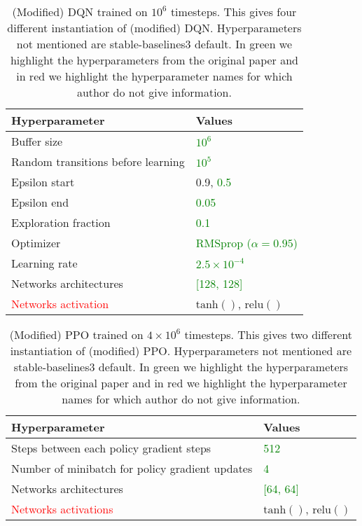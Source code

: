 \begin{table}[H]
    \centering
    \caption{(Modified) DQN trained on $10^6$ timesteps. This gives four different instantiation of (modified) DQN. Hyperparameters not mentioned are stable-baselines3 default. In green we highlight the hyperparameters from the original paper and in red we highlight the hyperparameter names for which author do not give information.}\label{tab:ibmdp-rl1}
    \begin{tabular}{ll}
    \toprule
    \textbf{Hyperparameter} & \textbf{Values}\\
    \midrule
    Buffer size & \textcolor{green}{$10^6$} \\
    Random transitions before learning & \textcolor{green}{$10^5$} \\
    Epsilon start & 0.9, \textcolor{green}{0.5} \\
    Epsilon end & \textcolor{green}{0.05} \\
    Exploration fraction & \textcolor{green}{0.1} \\
    Optimizer & \textcolor{green}{RMSprop ($\alpha = 0.95$)}\\
    Learning rate & \textcolor{green}{$2.5\times10^{-4}$}\\
    Networks architectures & \textcolor{green}{[128, 128]}\\
    \textcolor{red}{Networks activation} & $\operatorname{tanh()}$, $\operatorname{relu()}$\\
    \bottomrule
    \end{tabular}
    \end{table}

\begin{table}[H]
    \centering
    \caption{(Modified) PPO trained on $4\times10^6$ timesteps. This gives two different instantiation of (modified) PPO. Hyperparameters not mentioned are stable-baselines3 default. In green we highlight the hyperparameters from the original paper and in red we highlight the hyperparameter names for which author do not give information.}\label{tab:ibmdp-rl2}
    \begin{tabular}{ll}
    \toprule
    \textbf{Hyperparameter} & \textbf{Values}\\
    \midrule
    Steps between each policy gradient steps & \textcolor{green}{512} \\
    Number of minibatch for policy gradient updates & \textcolor{green}{4} \\
    Networks architectures & \textcolor{green}{[64, 64]}\\
    \textcolor{red}{Networks activations} & $\operatorname{tanh()}$, $\operatorname{relu()}$\\
    \bottomrule
    \end{tabular}
    \end{table}


